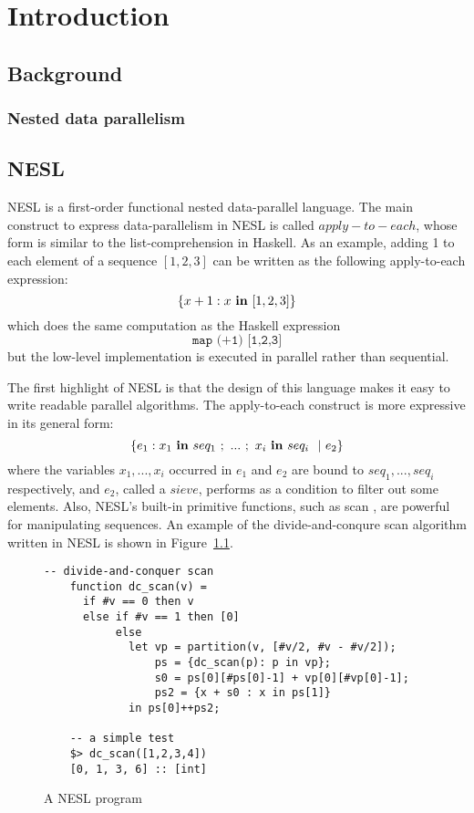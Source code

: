 
\chapter{Introduction}

\section{Background}
\subsection{Nested data parallelism}

\section{NESL}
NESL \cite{blel95nesl} is a first-order functional nested data-parallel language. The main construct to express data-parallelism in NESL is called $apply\!-\!to\!-\!each$, whose form is similar to the list-comprehension in Haskell. 
As an example, adding 1 to each element of a sequence $[1,2,3]$ can be written as the following apply-to-each expression:
$$ \{x+1 : x \ \mathbf{in} \ [1,2,3] \}$$
which does the same computation as the Haskell expression $$\texttt{map (+1) [1,2,3]}$$ 
but the low-level implementation is executed in parallel rather than sequential. 

The first highlight of NESL is that the design of this language makes it easy to write readable parallel algorithms. The apply-to-each construct is more expressive in its general form:
$$ \{ e_1 :  x_1 \ \*{in} \ seq_1 \ ; \ ... \ ; \ x_i \  \*{in} \ seq_i \ \ | \ e_2  \}$$
where the variables $x_1, ...,x_i$ occurred in $e_1$ and $e_2$ are bound to $seq_1,...,seq_i$ respectively, and $e_2$, called a $sieve$, performs as a condition to filter out some elements. 
Also, NESL's built-in primitive functions, such as scan \cite{blel89scan}, are powerful for manipulating sequences.
An example of the divide-and-conqure scan algorithm written in NESL is shown in Figure~\ref{fig-nesl-scan}.

\begin{figure}
\begin{lstlisting}[style=nesl-style]
	-- divide-and-conquer scan
	function dc_scan(v) =
	  if #v == 0 then v
	  else if #v == 1 then [0]
	       else 
	         let vp = partition(v, [#v/2, #v - #v/2]);
	             ps = {dc_scan(p): p in vp};
	             s0 = ps[0][#ps[0]-1] + vp[0][#vp[0]-1];
	             ps2 = {x + s0 : x in ps[1]}
	         in ps[0]++ps2;

	-- a simple test
	$> dc_scan([1,2,3,4])
	[0, 1, 3, 6] :: [int]
\end{lstlisting}
\caption{{A NESL program \label{fig-nesl-scan}}}
\end{figure}


